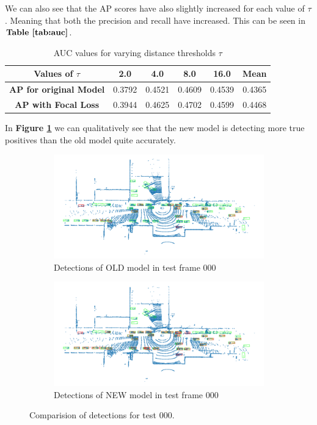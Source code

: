 \documentclass[letter]{article}
\newcommand{\fref}[1]{\textbf{Figure \ref{#1}}}
\begin{document}
	We can also see that the AP scores have also slightly increased for each value of $\tau$. Meaning that both the precision and recall have increased. This can be seen in $\textbf{Table \ref{tab:auc}}$.
	\begin{table}[!ht]
		\centering
		\begin{tabular}{|c|c|c|c|c|c|}
		\hline
		\textbf{Values of $\tau$} & 2.0 & 4.0 & 8.0 & 16.0 & \textbf{Mean} \\ \hline
		\textbf{AP for original Model} & 0.3792 & 0.4521 & 0.4609 & 0.4539 & 0.4365 \\ \hline
		\textbf{AP with Focal Loss} & 0.3944 & 0.4625 & 0.4702 & 0.4599 & 0.4468 \\ \hline
		\end{tabular}
		\caption{\label{tab:auc} AUC values for varying distance thresholds $\tau$}
	\end{table}

	In \fref{fig:comp-det}  we can qualitatively see that the new model is detecting more true positives than the old model quite accurately. 

	\begin{figure}[!h]
		\centering
		\begin{subfigure}[t]{0.49\textwidth}
			\centering
			\includegraphics[width=\linewidth]{images/000.png}
			\caption{Detections of OLD model in test frame 000}
		\end{subfigure}
		\begin{subfigure}[t]{0.49\textwidth}
			\centering
			\includegraphics[width=\linewidth]{images/000-focal.png}
			\caption{Detections of NEW model in test frame 000}
		\end{subfigure}
		\caption{Comparision of detections for test 000.}
		\label{fig:comp-det}
	\end{figure}
\end{document}
